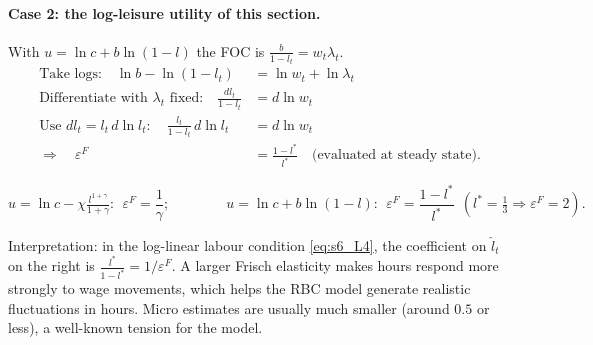 \paragraph{Case 2: the log-leisure utility of this section.} With $u=\ln c+b\ln(1-l)$ the FOC is $\frac{b}{1-l_t}=w_t\lambda_t$.
\begin{align*}
\text{Take logs:}\quad \ln b-\ln(1-l_t)&=\ln w_t+\ln\lambda_t\\
\text{Differentiate with }\lambda_t\text{ fixed:}\quad \frac{dl_t}{1-l_t}&=d\ln w_t\\
\text{Use }dl_t=l_t\,d\ln l_t:\quad \frac{l_t}{1-l_t}\,d\ln l_t&=d\ln w_t\\
\Rightarrow\quad \varepsilon^F&=\frac{1-l^*}{l^*}\quad\text{(evaluated at steady state)}.
\end{align*}
\begin{keybox}[title=Frisch elasticity]
\[
u=\ln c-\chi\tfrac{l^{1+\gamma}}{1+\gamma}:\ \ \varepsilon^F=\frac1\gamma;\qquad\qquad
u=\ln c+b\ln(1-l):\ \ \varepsilon^F=\frac{1-l^*}{l^*}\ \ (l^*=\tfrac13\Rightarrow\varepsilon^F=2).
\]
\end{keybox}
Interpretation: in the log-linear labour condition \eqref{eq:s6_L4}, the coefficient on $\hat l_t$ on the right is $\frac{l^*}{1-l^*}=1/\varepsilon^F$. A larger Frisch elasticity makes hours respond more strongly to wage movements, which helps the RBC model generate realistic fluctuations in hours. Micro estimates are usually much smaller (around $0.5$ or less), a well-known tension for the model.
